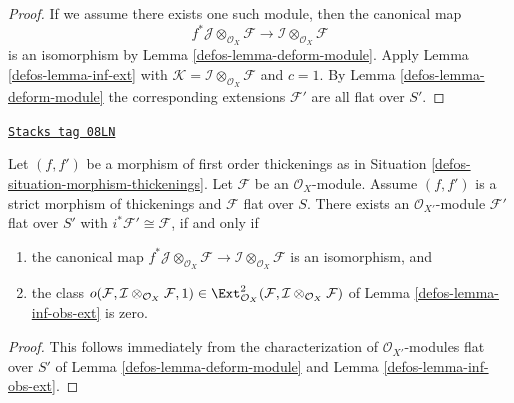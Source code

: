 \begin{proof}

If we assume there exists one such module, then the canonical map
$$
f^*\mathcal{J} \otimes_{\mathcal{O}_X} \mathcal{F} \to
\mathcal{I} \otimes_{\mathcal{O}_X} \mathcal{F}
$$
is an isomorphism by Lemma \ref{defos-lemma-deform-module}. Apply
Lemma \ref{defos-lemma-inf-ext} with $\mathcal{K} =
\mathcal{I} \otimes_{\mathcal{O}_X} \mathcal{F}$
and $c = 1$. By Lemma \ref{defos-lemma-deform-module} the corresponding extensions
$\mathcal{F}'$ are all flat over $S'$.
\end{proof}

\begin{lemma}
\label{defos-lemma-inf-obs-ext-rel}
\href{https://stacks.math.columbia.edu/tag/08LN}{\texttt{Stacks tag 08LN}}

Let $(f, f')$ be a morphism of first order thickenings as in
Situation \ref{defos-situation-morphism-thickenings}.
Let $\mathcal{F}$ be an $\mathcal{O}_X$-module. Assume
$(f, f')$ is a strict morphism of thickenings
and $\mathcal{F}$ flat over $S$. There exists an
$\mathcal{O}_{X'}$-module $\mathcal{F}'$ flat over $S'$ with
$i^*\mathcal{F}' \cong \mathcal{F}$, if and only if
\begin{enumerate}
\item the canonical map $
f^*\mathcal{J} \otimes_{\mathcal{O}_X} \mathcal{F} \to
\mathcal{I} \otimes_{\mathcal{O}_X} \mathcal{F}$
is an isomorphism, and
\item the class
$o(\mathcal{F}, \mathcal{I} \otimes_{\mathcal{O}_X} \mathcal{F}, 1)
\in \Ext^2_{\mathcal{O}_X}(
\mathcal{F}, \mathcal{I} \otimes_{\mathcal{O}_X} \mathcal{F})$
of Lemma \ref{defos-lemma-inf-obs-ext} is zero.
\end{enumerate}
\end{lemma}

\begin{proof}

This follows immediately from the characterization of
$\mathcal{O}_{X'}$-modules flat over $S'$ of
Lemma \ref{defos-lemma-deform-module} and
Lemma \ref{defos-lemma-inf-obs-ext}.
\end{proof}

